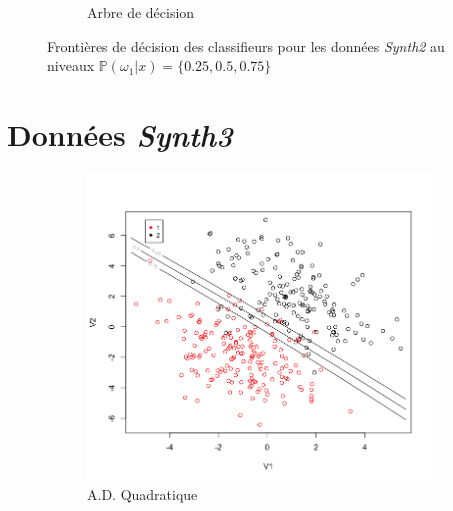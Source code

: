 \documentclass[a4paper,10pt]{report}
\begin{document}
\begin{figure}[H]
\begin{subfigure}[b]{0.45\linewidth}
		\caption{\small Arbre de décision}
		\label{fig:front-decision-synth-2-tree}%
	\end{subfigure}%
	\caption{\small Frontières de décision des classifieurs pour les données \textit{Synth2} au niveaux $\mathbb{P}(\omega_1|x) = \{0.25, 0.5, 0.75\}$}
	\label{fig:front-decision-synth-2}%
\end{figure}



\section{Données \textit{Synth3}}
\label{appendix:front-decision-synth-3}


\begin{figure}[H]
	\centering
	\captionsetup{justification=centering, margin=2cm}
	\begin{subfigure}[b]{0.45\linewidth}
		\centering
		\captionsetup{justification=centering, margin=1cm}
		\includegraphics[width=1\linewidth]{img/front-decision-synth-3-adq}
		\caption{\small A.D. Quadratique}
		\label{fig:front-decision-synth-3-adq}%
	\end{subfigure}%
	\begin{subfigure}[b]{0.45\linewidth}
		\centering
		\captionsetup{justification=centering, margin=1cm}

\end{subfigure}
\end{figure}
\end{document}
